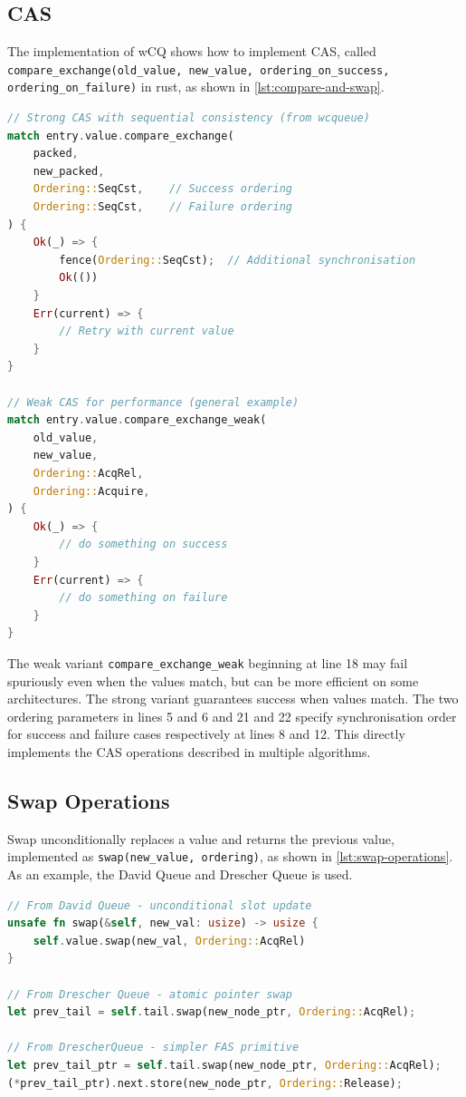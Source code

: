 \subsection{\acf{CAS}}

The implementation of \ac{wCQ} shows how to implement \ac{CAS}, called \newline \texttt{compare\_exchange(old\_value, new\_value, ordering\_on\_success, \newline ordering\_on\_failure)} in rust, as shown in \cref{lst:compare-and-swap}.

\begin{lstlisting}[language=Rust, style=boxed, caption={Compare-and-swap variants and usage patterns}, label={lst:compare-and-swap}]
// Strong CAS with sequential consistency (from wcqueue)
match entry.value.compare_exchange(
    packed,
    new_packed,
    Ordering::SeqCst,    // Success ordering
    Ordering::SeqCst,    // Failure ordering
) {
    Ok(_) => {
        fence(Ordering::SeqCst);  // Additional synchronisation
        Ok(())
    }
    Err(current) => {
        // Retry with current value
    }
}

// Weak CAS for performance (general example)
match entry.value.compare_exchange_weak(
    old_value,
    new_value,
    Ordering::AcqRel,
    Ordering::Acquire,
) {
    Ok(_) => {
        // do something on success
    }
    Err(current) => {
        // do something on failure
    }
}
\end{lstlisting}

The weak variant \texttt{compare\_exchange\_weak} beginning at line 18 may fail spuriously even when the values match, but can be more efficient on some architectures. The strong variant guarantees success when values match. The two ordering parameters in lines 5 and 6 and 21 and 22 specify synchronisation order for success and failure cases respectively at lines 8 and 12. This directly implements the CAS operations described in multiple algorithms.

\subsection{Swap Operations}

Swap unconditionally replaces a value and returns the previous value, implemented as \texttt{swap(new\_value, ordering)}, as shown in \cref{lst:swap-operations}. As an example, the David Queue and Drescher Queue is used.

\begin{lstlisting}[language=Rust, style=boxed, caption={Unconditional atomic swap operations}, label={lst:swap-operations}]
// From David Queue - unconditional slot update
unsafe fn swap(&self, new_val: usize) -> usize {
    self.value.swap(new_val, Ordering::AcqRel)
}

// From Drescher Queue - atomic pointer swap
let prev_tail = self.tail.swap(new_node_ptr, Ordering::AcqRel);

// From DrescherQueue - simpler FAS primitive
let prev_tail_ptr = self.tail.swap(new_node_ptr, Ordering::AcqRel);
(*prev_tail_ptr).next.store(new_node_ptr, Ordering::Release);
\end{lstlisting}

